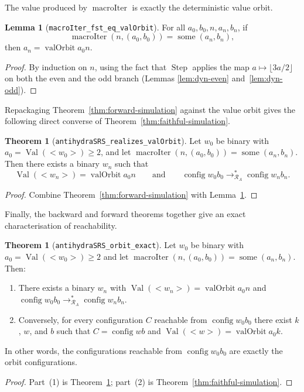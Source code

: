 \documentclass[11pt,a4paper]{article}
\theoremstyle{definition}
\newtheorem{lemma}[definition]{Lemma}
\newtheorem{theorem}[definition]{Theorem}
\newcommand{\lt}{<}
\newcommand{\gt}{>}
\newcommand{\val}{\operatorname{Val}}
\newcommand{\config}{\operatorname{config}}
\newcommand{\antihydraSRS}{\mathcal{R}_{A}}
\newcommand{\macroStep}{\operatorname{Step}}
\newcommand{\some}{\operatorname{some}}
\newcommand{\valOrbit}{\operatorname{valOrbit}}
\newcommand{\macroIter}{\operatorname{macroIter}}
\begin{document}
The value produced by $\macroIter$ is exactly the deterministic value
orbit.

\begin{lemma}[\texttt{macroIter\_fst\_eq\_valOrbit}]
\label{lem:macroiter-valorbit}
For all $a_0,b_0,n,a_n,b_n$, if
\[
  \macroIter(n,(a_0,b_0))=\some(a_n,b_n),
\]
then $a_n=\valOrbit{a_0}{n}$.
\end{lemma}
\begin{proof}
By induction on $n$, using the fact that $\macroStep$ applies the map
$a\mapsto\lfloor3a/2\rfloor$ on both the even and the odd branch
(Lemmas \ref{lem:dyn-even} and~\ref{lem:dyn-odd}).
\end{proof}

Repackaging Theorem~\ref{thm:forward-simulation} against the value orbit
gives the following direct converse of
Theorem~\ref{thm:faithful-simulation}.

\begin{theorem}[\texttt{antihydraSRS\_realizes\_valOrbit}]
\label{thm:forward-valorbit}
Let $w_0$ be binary with $a_0=\val(\lt w_0\gt)\ge2$, and let
$\macroIter(n,(a_0,b_0))=\some(a_n,b_n)$.  Then there exists a binary
$w_n$ such that
\[
  \val(\lt w_n\gt)=\valOrbit{a_0}{n}
  \qquad\text{and}\qquad
  \config{w_0}{b_0}
  \to^{*}_{\antihydraSRS}
  \config{w_n}{b_n}.
\]
\end{theorem}
\begin{proof}
Combine Theorem~\ref{thm:forward-simulation} with
Lemma~\ref{lem:macroiter-valorbit}.
\end{proof}

Finally, the backward and forward theorems together give an exact
characterisation of reachability.

\begin{theorem}[\texttt{antihydraSRS\_orbit\_exact}]
\label{thm:orbit-exact}
Let $w_0$ be binary with $a_0=\val(\lt w_0\gt)\ge2$ and let
$\macroIter(n,(a_0,b_0))=\some(a_n,b_n)$.  Then:
\begin{enumerate}
\item There exists a binary $w_n$ with
  $\val(\lt w_n\gt)=\valOrbit{a_0}{n}$ and
  $\config{w_0}{b_0}\to^{*}_{\antihydraSRS}\config{w_n}{b_n}$.
\item Conversely, for every configuration $C$ reachable from
  $\config{w_0}{b_0}$ there exist $k$, $w$, and $b$ such that
  $C=\config{w}{b}$ and $\val(\lt w\gt)=\valOrbit{a_0}{k}$.
\end{enumerate}
In other words, the configurations reachable from
$\config{w_0}{b_0}$ are exactly the orbit configurations.
\end{theorem}
\begin{proof}
Part~(1) is Theorem~\ref{thm:forward-valorbit}; part~(2) is
Theorem~\ref{thm:faithful-simulation}.
\end{proof}
\end{document}
